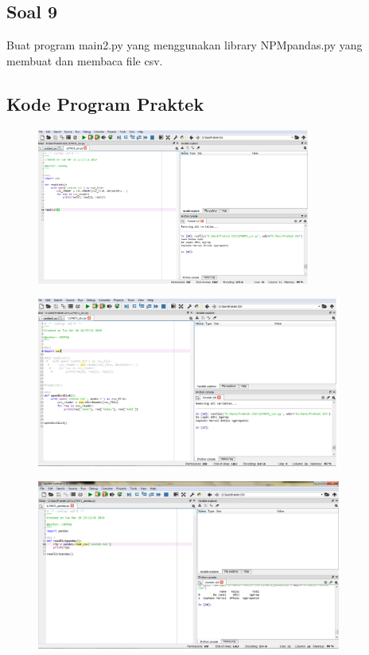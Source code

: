 \subsection{Soal 9}
Buat program main2.py yang menggunakan library NPMpandas.py yang membuat dan membaca file csv.



\subsection{Kode Program Praktek}
\begin{figure}[ht]
	\includegraphics[width=9cm]{figures/4/1174071/Praktek/1174071_csv1.png}
	\centering
\end{figure}
\begin{figure}[ht]
	\includegraphics[width=10cm]{figures/4/1174071/Praktek/1174071_csv2.png}
	\centering
\end{figure}
\begin{figure}[ht]
	\includegraphics[width=10cm]{figures/4/1174071/Praktek/1174071_pandas3.png}
	\centering
\end{figure}

